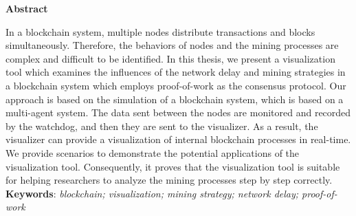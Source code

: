 \thispagestyle{plain}
\vspace*{\fill}
    \begin{center}
        \Large
        \textbf{Abstract}
    \end{center}
    
    \vspace{1cm}
    
    In a blockchain system, multiple nodes distribute transactions and blocks simultaneously. Therefore, the behaviors of nodes and the mining processes are complex and difficult to be identified. In this thesis, we present a visualization tool which examines the influences of the network delay and mining strategies in a blockchain system which employs proof-of-work as the consensus protocol. Our approach is based on the simulation of a blockchain system, which is based on a multi-agent system. The data sent between the nodes are monitored and recorded by the watchdog, and then they are sent to the visualizer. As a result, the visualizer can provide a visualization of internal blockchain processes in real-time. We provide scenarios to demonstrate the potential applications of the visualization tool. Consequently, it proves that the visualization tool is suitable for helping researchers to analyze the mining processes step by step correctly. \\
    
    \textbf{Keywords}: \textit{blockchain; visualization; mining strategy; network delay; proof-of-work}
\vspace*{\fill}

